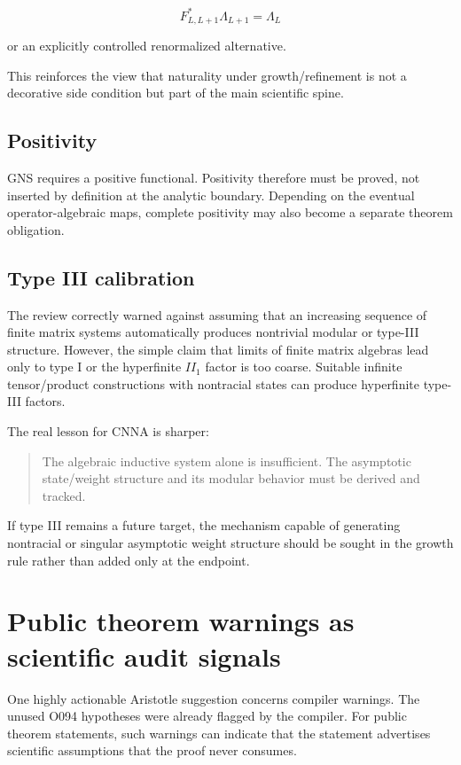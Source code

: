 \documentclass[11pt,a4paper]{article}
\begin{document}
\[
F_{L,L+1}^{*}\Lambda_{L+1}=\Lambda_{L}
\]

or an explicitly controlled renormalized alternative.

This reinforces the view that naturality under growth/refinement is not a decorative side condition but part of the main scientific spine.

\subsection{Positivity}

GNS requires a positive functional. Positivity therefore must be proved, not inserted by definition at the analytic boundary. Depending on the eventual operator-algebraic maps, complete positivity may also become a separate theorem obligation.

\subsection{Type III calibration}

The review correctly warned against assuming that an increasing sequence of finite matrix systems automatically produces nontrivial modular or type-III structure. However, the simple claim that limits of finite matrix algebras lead only to type I or the hyperfinite $II_{1}$ factor is too coarse. Suitable infinite tensor/product constructions with nontracial states can produce hyperfinite type-III factors.

The real lesson for CNNA is sharper:

\begin{quote}
The algebraic inductive system alone is insufficient. The asymptotic state/weight structure and its modular behavior must be derived and tracked.
\end{quote}

If type III remains a future target, the mechanism capable of generating nontracial or singular asymptotic weight structure should be sought in the growth rule rather than added only at the endpoint.

\section{Public theorem warnings as scientific audit signals}

One highly actionable Aristotle suggestion concerns compiler warnings. The unused O094 hypotheses were already flagged by the compiler. For public theorem statements, such warnings can indicate that the statement advertises scientific assumptions that the proof never consumes.
\end{document}
